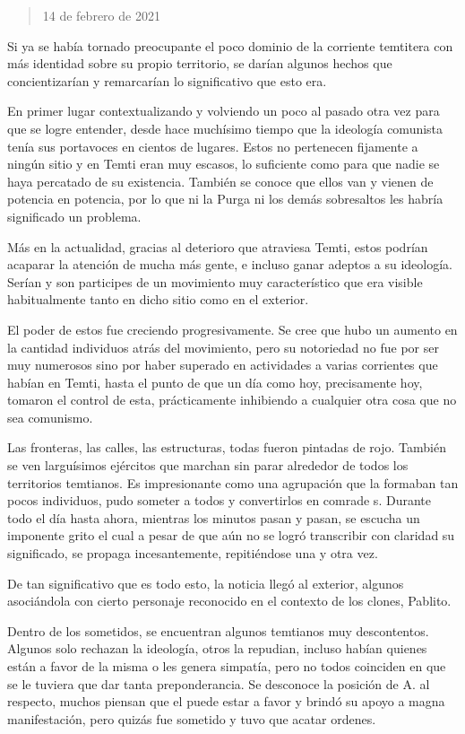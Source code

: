 \documentclass[
  spanish,
]{book}
\begin{document}
\begin{quote}
14 de febrero de 2021
\end{quote}

Si ya se había tornado preocupante el poco dominio de la corriente temtitera con más identidad sobre su propio territorio, se darían algunos hechos que concientizarían y remarcarían lo significativo que esto era.

En primer lugar contextualizando y volviendo un poco al pasado otra vez para que se logre entender, desde hace muchísimo tiempo que la ideología comunista tenía sus portavoces en cientos de lugares. Estos no pertenecen fijamente a ningún sitio y en Temti eran muy escasos, lo suficiente como para que nadie se haya percatado de su existencia. También se conoce que ellos van y vienen de potencia en potencia, por lo que ni la Purga ni los demás sobresaltos les habría significado un problema.

Más en la actualidad, gracias al deterioro que atraviesa Temti, estos podrían acaparar la atención de mucha más gente, e incluso ganar adeptos a su ideología. Serían y son participes de un movimiento muy característico que era visible habitualmente tanto en dicho sitio como en el exterior.

El poder de estos fue creciendo progresivamente. Se cree que hubo un aumento en la cantidad individuos atrás del movimiento, pero su notoriedad no fue por ser muy numerosos sino por haber superado en actividades a varias corrientes que habían en Temti, hasta el punto de que un día como hoy, precisamente hoy, tomaron el control de esta, prácticamente inhibiendo a cualquier otra cosa que no sea comunismo.

Las fronteras, las calles, las estructuras, todas fueron pintadas de rojo. También se ven larguísimos ejércitos que marchan sin parar alrededor de todos los territorios temtianos. Es impresionante como una agrupación que la formaban tan pocos individuos, pudo someter a todos y convertirlos en comrade s. Durante todo el día hasta ahora, mientras los minutos pasan y pasan, se escucha un imponente grito el cual a pesar de que aún no se logró transcribir con claridad su significado, se propaga incesantemente, repitiéndose una y otra vez.

De tan significativo que es todo esto, la noticia llegó al exterior, algunos asociándola con cierto personaje reconocido en el contexto de los clones, Pablito.

Dentro de los sometidos, se encuentran algunos temtianos muy descontentos. Algunos solo rechazan la ideología, otros la repudian, incluso habían quienes están a favor de la misma o les genera simpatía, pero no todos coinciden en que se le tuviera que dar tanta preponderancia. Se desconoce la posición de A. al respecto, muchos piensan que el puede estar a favor y brindó su apoyo a magna manifestación, pero quizás fue sometido y tuvo que acatar ordenes.
\end{document}
